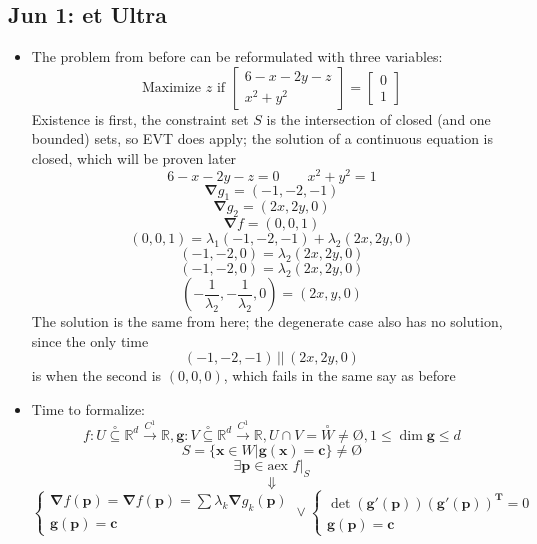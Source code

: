 \documentclass[10pt, oneside]{article}
\let\leq\leqslant
\newcommand{\R}{\mathbb{R}}
\let \foo \O
\renewcommand{\O}{\text{\foo}}
\renewcommand{\vec}[1]{\mathbf{#1}}
\newcommand{\vecf}[1]{\boldsymbol{#1}}
\newcommand{\mat}[1]{\mathbf{#1}}
\begin{document}
\subsection{Jun 1: et Ultra}
\begin{itemize}
    \item The problem from before can be reformulated with three variables:
            \[\text{Maximize } z \text{ if } \begin{bmatrix} 
            6 - x - 2y - z\\
            x^2 + y^2 
            \end{bmatrix} = \begin{bmatrix} 
            0\\
            1 
            \end{bmatrix}\]
        Existence is first, the constraint set $S$ is the intersection of closed (and one bounded) sets, so EVT does apply; the solution of a continuous equation is closed, which will be proven later
            \[6-x-2y-z = 0 \quad \quad x^2 + y^2 = 1\]
            \[\vec{\nabla} g_1 = (-1,-2,-1)\]
            \[\vec{\nabla} g_2 = (2x, 2y,0)\]
            \[\vec{\nabla} f = (0,0,1)\]
            \[(0,0,1) = \lambda_1 (-1,-2,-1) + \lambda_2 (2x,2y,0)\]
            \[(-1,-2,0) = \lambda_2 (2x,2y,0)\]
            \[(-1,-2,0) = \lambda_2 (2x,2y,0)\]
            \[\left( -\frac{1}{\lambda_2},-\frac{1}{\lambda_2},0 \right) = (2x,y,0)\]
        The solution is the same from here; the degenerate case also has no solution, since the only time
            \[(-1,-2,-1) \, || \, (2x,2y,0)\]
        is when the second is $(0,0,0)$, which fails in the same say as before
    \item Time to formalize: 
            \[f: U \overset{\circ}{\subseteq} \R^d \overset{C^1}{\rightarrow} \R ,\vecf{g} : V \overset{\circ}{\subseteq} \R^d \overset{C^1}{\rightarrow} \R, U \cap V = \overset{\circ} W \neq \O, 1 \leq \dim{\vecf{g}} \leq d\]
            \[S = \{\vec{x} \in W | \vecf{g}(\vec{x}) = \vec{c}\} \neq \O\]
            \[\exists \vec{p} \in \text{aex } f|_S\]
            \[\Downarrow\]
            \[\begin{cases}
                \vec{\nabla} f(\vec{p}) = \vec{\nabla} f(\vec{p}) = \sum \lambda_k \vec{\nabla} g_k(\vec{p})\\
                \vecf{g}(\vec{p}) = \vec{c}
            \end{cases} \lor
            \begin{cases}
                \det (\vecf{g}'(\vec{p}))(\vecf{g}'(\vec{p}))^\mat{T} = 0\\
                \vecf{g}(\vec{p}) = \vec{c}
            \end{cases}\]
\end{itemize}
\end{document}
